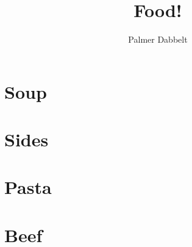 \documentclass{book}
\author{Palmer Dabbelt}
\title{Food!}
\begin{document}
\maketitle
\tableofcontents
\contentsskip

\newcommand{\maketitle}{}
\renewcommand{\tableofcontents}{}
\newcommand{\author}[1]{}
\newcommand{\title}[1]{}
\renewcommand{\contentsskip}{}
\renewcommand{\bref}[1]{\ref{#1}}

\chapter{Soup}


\chapter{Sides}


\chapter{Pasta}



\chapter{Beef}

\end{document}
